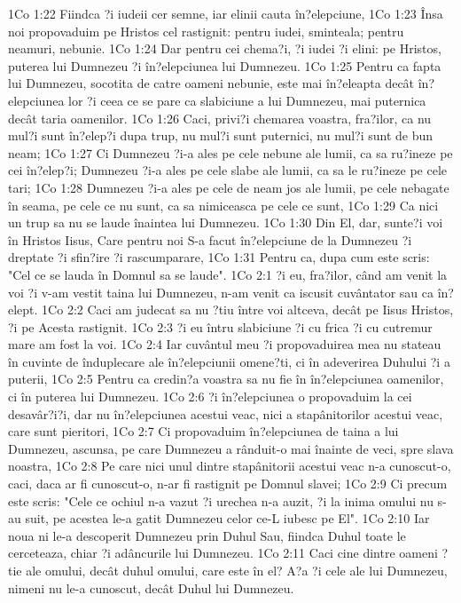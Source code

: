 1Co 1:22  Fiindca ?i iudeii cer semne, iar elinii cauta în?elepciune,
1Co 1:23  Însa noi propovaduim pe Hristos cel rastignit: pentru iudei, sminteala; pentru neamuri, nebunie.
1Co 1:24  Dar pentru cei chema?i, ?i iudei ?i elini: pe Hristos, puterea lui Dumnezeu ?i în?elepciunea lui Dumnezeu.
1Co 1:25  Pentru ca fapta lui Dumnezeu, socotita de catre oameni nebunie, este mai în?eleapta decât în?elepciunea lor ?i ceea ce se pare ca slabiciune a lui Dumnezeu, mai puternica decât taria oamenilor.
1Co 1:26  Caci, privi?i chemarea voastra, fra?ilor, ca nu mul?i sunt în?elep?i dupa trup, nu mul?i sunt puternici, nu mul?i sunt de bun neam;
1Co 1:27  Ci Dumnezeu ?i-a ales pe cele nebune ale lumii, ca sa ru?ineze pe cei în?elep?i; Dumnezeu ?i-a ales pe cele slabe ale lumii, ca sa le ru?ineze pe cele tari;
1Co 1:28  Dumnezeu ?i-a ales pe cele de neam jos ale lumii, pe cele nebagate în seama, pe cele ce nu sunt, ca sa nimiceasca pe cele ce sunt,
1Co 1:29  Ca nici un trup sa nu se laude înaintea lui Dumnezeu.
1Co 1:30  Din El, dar, sunte?i voi în Hristos Iisus, Care pentru noi S-a facut în?elepciune de la Dumnezeu ?i dreptate ?i sfin?ire ?i rascumparare,
1Co 1:31  Pentru ca, dupa cum este scris: "Cel ce se lauda în Domnul sa se laude".
1Co 2:1  ?i eu, fra?ilor, când am venit la voi ?i v-am vestit taina lui Dumnezeu, n-am venit ca iscusit cuvântator sau ca în?elept.
1Co 2:2  Caci am judecat sa nu ?tiu între voi altceva, decât pe Iisus Hristos, ?i pe Acesta rastignit.
1Co 2:3  ?i eu întru slabiciune ?i cu frica ?i cu cutremur mare am fost la voi.
1Co 2:4  Iar cuvântul meu ?i propovaduirea mea nu stateau în cuvinte de înduplecare ale în?elepciunii omene?ti, ci în adeverirea Duhului ?i a puterii,
1Co 2:5  Pentru ca credin?a voastra sa nu fie în în?elepciunea oamenilor, ci în puterea lui Dumnezeu.
1Co 2:6  ?i în?elepciunea o propovaduim la cei desavâr?i?i, dar nu în?elepciunea acestui veac, nici a stapânitorilor acestui veac, care sunt pieritori,
1Co 2:7  Ci propovaduim în?elepciunea de taina a lui Dumnezeu, ascunsa, pe care Dumnezeu a rânduit-o mai înainte de veci, spre slava noastra,
1Co 2:8  Pe care nici unul dintre stapânitorii acestui veac n-a cunoscut-o, caci, daca ar fi cunoscut-o, n-ar fi rastignit pe Domnul slavei;
1Co 2:9  Ci precum este scris: "Cele ce ochiul n-a vazut ?i urechea n-a auzit, ?i la inima omului nu s-au suit, pe acestea le-a gatit Dumnezeu celor ce-L iubesc pe El".
1Co 2:10  Iar noua ni le-a descoperit Dumnezeu prin Duhul Sau, fiindca Duhul toate le cerceteaza, chiar ?i adâncurile lui Dumnezeu.
1Co 2:11  Caci cine dintre oameni ?tie ale omului, decât duhul omului, care este în el? A?a ?i cele ale lui Dumnezeu, nimeni nu le-a cunoscut, decât Duhul lui Dumnezeu.
